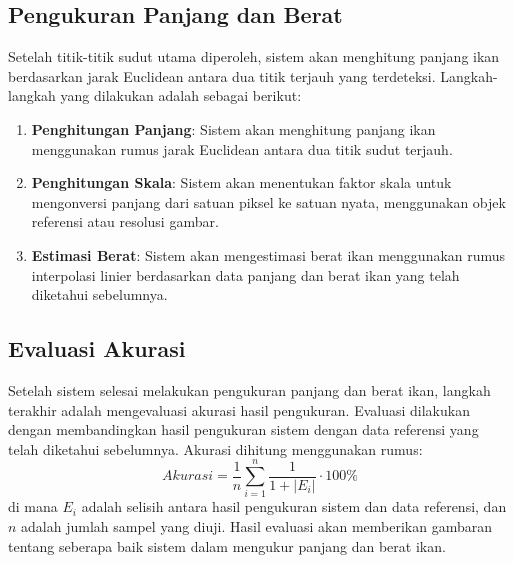 \subsection{Pengukuran Panjang dan Berat}
    Setelah titik-titik sudut utama diperoleh, sistem akan menghitung panjang ikan berdasarkan jarak Euclidean antara dua titik terjauh yang terdeteksi. Langkah-langkah yang dilakukan adalah sebagai berikut:
\begin{enumerate}
    \item \textbf{Penghitungan Panjang}: Sistem akan menghitung panjang ikan menggunakan rumus jarak Euclidean antara dua titik sudut terjauh.
    \item \textbf{Penghitungan Skala}: Sistem akan menentukan faktor skala untuk mengonversi panjang dari satuan piksel ke satuan nyata, menggunakan objek referensi atau resolusi gambar.
    \item \textbf{Estimasi Berat}: Sistem akan mengestimasi berat ikan menggunakan rumus interpolasi linier berdasarkan data panjang dan berat ikan yang telah diketahui sebelumnya.
\end{enumerate}

\subsection{Evaluasi Akurasi}
    Setelah sistem selesai melakukan pengukuran panjang dan berat ikan, langkah terakhir adalah mengevaluasi akurasi hasil pengukuran. Evaluasi dilakukan dengan membandingkan hasil pengukuran sistem dengan data referensi yang telah diketahui sebelumnya. 
    Akurasi dihitung menggunakan rumus:
\begin{equation}
    Akurasi = \frac{1}{n} \sum_{i=1}^{n} \frac{1}{1 + |E_i|} \cdot 100\%
\end{equation}
    di mana \(E_i\) adalah selisih antara hasil pengukuran sistem dan data referensi, dan \(n\) adalah jumlah sampel yang diuji. Hasil evaluasi akan memberikan gambaran tentang seberapa baik sistem dalam mengukur panjang dan berat ikan.